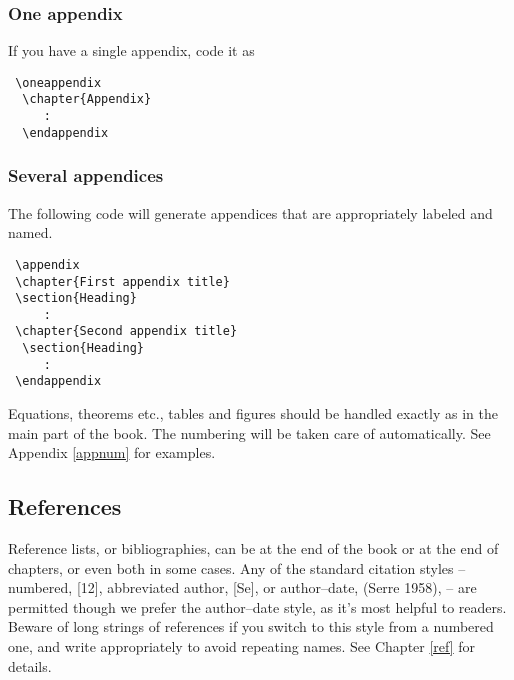 \subsubsection{One appendix}
If you have a single appendix, code it as
\begin{verbatim}
 \oneappendix
  \chapter{Appendix}
     :
  \endappendix
\end{verbatim}

\subsubsection{Several appendices}
The following code will generate appendices that are appropriately labeled and named.
\begin{verbatim}
 \appendix
 \chapter{First appendix title}
 \section{Heading}
     :
 \chapter{Second appendix title}
  \section{Heading}
     :
 \endappendix
\end{verbatim}

Equations, theorems etc., tables and figures should be handled exactly as in the main part
of the book. The numbering will be taken care of automatically.
See Appendix \ref{appnum} for examples.

\subsection{References}
Reference lists, or bibliographies, can be at the end of the book
or at the end of chapters, or even both in some cases.
Any of the standard citation styles -- numbered, [12], abbreviated author, [Se],
 or author--date, (Serre 1958), -- are permitted though we prefer the author--date
style, as it's most helpful to readers. Beware of long strings of references
if you switch to this style from a numbered one, and write appropriately to
avoid repeating names. See Chapter \ref{ref} for details.

